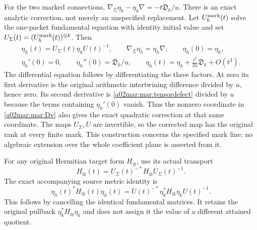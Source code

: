 For the two marked connections,
$\nabla_\Sigma\eta_k-\eta_k\nabla=-t\mathfrak D_k/u$.
There is an exact analytic correction, not merely an unspecified
replacement. Let $U_h^{\rm mark}(t)$ solve the one-packet
fundamental equation with identity initial value and set
$U_\Sigma(t)=(U_h^{\rm mark}(t))^{\otimes k}$.
Then
\begin{equation}\tag{MAR25}\label{a02mar:mar:eta-horizontal}
 \begin{gathered}
 \eta_h(t)=U_\Sigma(t)\eta_k U(t)^{-1},\qquad
 \nabla_\Sigma\eta_h=\eta_h\nabla,\qquad\eta_h(0)=\eta_k,\\
 \eta_h'(0)=0,\qquad\eta_h''(0)=\mathfrak D_k/u,
 \qquad\eta_h(t)=\eta_k+\frac{t^2}{2u}\mathfrak D_k+O(t^3).
 \end{gathered}
\end{equation}
The differential equation follows by differentiating the three
factors. At zero its first derivative is the original arithmetic
intertwining difference divided by $u$, hence zero. Its second
derivative is \eqref{a02mar:mar:tensordefect} divided by $u$ because
the terms containing $\eta_h'(0)$ vanish. Thus the nonzero
coordinate in \eqref{a02mar:mar:Dv} also gives the exact quadratic
correction at that same coordinate. The maps $U_\Sigma,U$ are
invertible, so the corrected map has the original rank at every
finite mark. This construction concerns the specified mark line;
no algebraic extension over the whole coefficient plane is
asserted from it.

For any original Hermitian target form $H_\otimes$, use its actual
transport \[H_\otimes(t)=U_\Sigma(t)^{-*}H_\otimes U_\Sigma(t)^{-1}.\]
The exact accompanying source metric identity is
\begin{equation}\tag{MAR26}\label{a02mar:mar:tensormetric}
 \eta_h(t)^*H_\otimes(t)\eta_h(t)
    =U(t)^{-*}\eta_k^*H_\otimes\eta_k U(t)^{-1}.
\end{equation}
This follows by cancelling the identical fundamental matrices.
It retains the original pullback $\eta_k^*H_\otimes\eta_k$ and
does not assign it the value of a different attained quotient.


